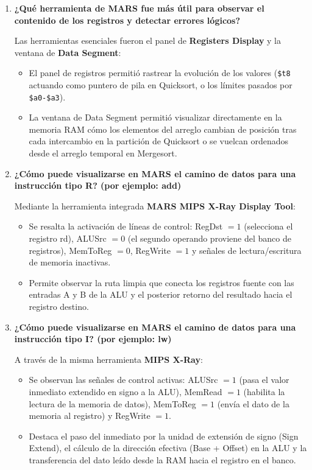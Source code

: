 \documentclass[12pt,letterpaper]{article}
\begin{document}
\begin{enumerate}
    \newpage
    \item \textbf{\large\color{UCBlue}¿Qué herramienta de MARS fue más útil para observar el contenido de los registros y detectar errores lógicos?}
    
    \vspace{0.2cm}
    Las herramientas esenciales fueron el panel de \textbf{Registers Display} y la ventana de \textbf{Data Segment}:
    \begin{itemize}
        \item El panel de registros permitió rastrear la evolución de los valores (\texttt{\$t8} actuando como puntero de pila en Quicksort, o los límites pasados por \texttt{\$a0-\$a3}).
        \item La ventana de Data Segment permitió visualizar directamente en la memoria RAM cómo los elementos del arreglo cambian de posición tras cada intercambio en la partición de Quicksort o se vuelcan ordenados desde el arreglo temporal en Mergesort.
    \end{itemize}

    \item \textbf{\large\color{UCBlue}¿Cómo puede visualizarse en MARS el camino de datos para una instrucción tipo R? (por ejemplo: add)}
    
    \vspace{0.2cm}
    Mediante la herramienta integrada \textbf{MARS MIPS X-Ray Display Tool}:
    \begin{itemize}
        \item Se resalta la activación de líneas de control: RegDst $= 1$ (selecciona el registro rd), ALUSrc $= 0$ (el segundo operando proviene del banco de registros), MemToReg $= 0$, RegWrite $= 1$ y señales de lectura/escritura de memoria inactivas.
        \item Permite observar la ruta limpia que conecta los registros fuente con las entradas A y B de la ALU y el posterior retorno del resultado hacia el registro destino.
    \end{itemize}

    \item \textbf{\large\color{UCBlue}¿Cómo puede visualizarse en MARS el camino de datos para una instrucción tipo I? (por ejemplo: lw)}
    
    \vspace{0.2cm}
    A través de la misma herramienta \textbf{MIPS X-Ray}:
    \begin{itemize}
        \item Se observan las señales de control activas: ALUSrc $= 1$ (pasa el valor inmediato extendido en signo a la ALU), MemRead $= 1$ (habilita la lectura de la memoria de datos), MemToReg $= 1$ (envía el dato de la memoria al registro) y RegWrite $= 1$.
        \item Destaca el paso del inmediato por la unidad de extensión de signo (Sign Extend), el cálculo de la dirección efectiva (Base + Offset) en la ALU y la transferencia del dato leído desde la RAM hacia el registro en el banco.
    \end{itemize}


\end{enumerate}
\end{document}
